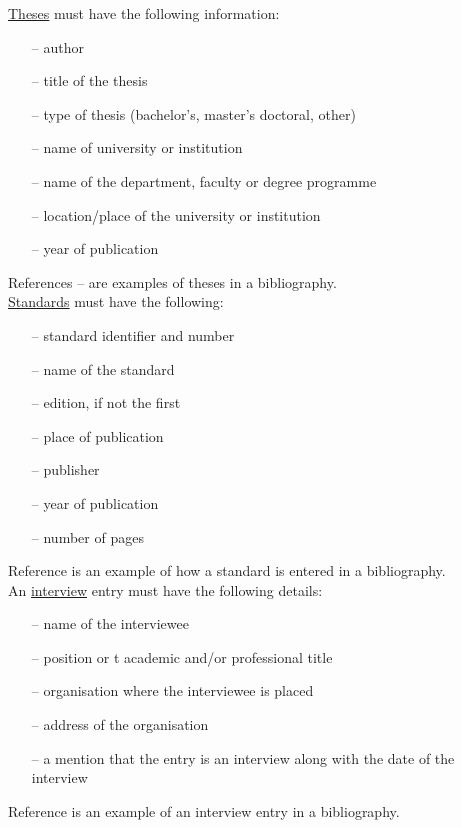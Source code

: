 \documentclass[english, 12pt, a4paper, elec, utf8, a-2b, online]{aaltothesis}
\begin{document}
\noindent
\underline{Theses} must have the following information:
\begin{itemize}
\setlength{\itemsep}{-3pt}
\item[--]author
\item[--]title of the thesis
\item[--]type of thesis (bachelor's, master's doctoral, other)
\item[--]name of university or institution
\item[--]name of the department, faculty or degree programme
\item[--]location/place of the university or institution
\item[--]year of publication
\end{itemize}
References \cite{Miinusmaa}--\cite{Lonnqvist} are examples of theses in a 
bibliography.\\

\noindent
\underline{Standards} must have the following:
\begin{itemize}
\setlength{\itemsep}{-3pt}
\item[--]standard identifier and number
\item[--]name of the standard
\item[--]edition, if not the first
\item[--]place of publication
\item[--]publisher
\item[--]year of publication
\item[--]number of pages
\end{itemize}
Reference \cite{sfs} is an example of how a standard is entered in a 
bibliography.\\

\noindent
An \underline{interview} entry must have the following details:
\begin{itemize}
\setlength{\itemsep}{-3pt}
\item[--]name of the interviewee
\item[--]position or t academic and/or professional title
\item[--]organisation where the interviewee is placed
\item[--]address of the organisation
\item[--]a mention that the entry is an interview along with the date of the 
interview
\end{itemize}
Reference \cite{interview} is an example of an interview entry in a 
bibliography.
\end{document}
